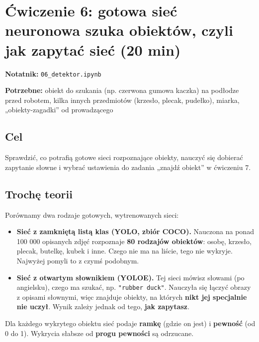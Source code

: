\section{Ćwiczenie 6: gotowa sieć neuronowa szuka obiektów, czyli jak zapytać sieć (20 min)}\label{ux107wiczenie-6-gotowa-sieux107-neuronowa-szuka-obiektuxf3w-czyli-jak-zapytaux107-sieux107-20-min}

\textbf{Notatnik:} \texttt{06\_detektor.ipynb}

\textbf{Potrzebne:} obiekt do szukania (np. czerwona gumowa kaczka) na podłodze przed robotem, kilka innych przedmiotów (krzesło, plecak, pudełko), miarka, „obiekty-zagadki'' od prowadzącego

\subsection{Cel}\label{cel}

Sprawdzić, co potrafią gotowe sieci rozpoznające obiekty, nauczyć się dobierać zapytanie słowne i wybrać ustawienia do zadania „znajdź obiekt'' w ćwiczeniu 7.

\subsection{Trochę teorii}\label{trochux119-teorii}

Porównamy dwa rodzaje gotowych, wytrenowanych sieci:

\begin{itemize}
\tightlist
\item
  \textbf{Sieć z zamkniętą listą klas (YOLO, zbiór COCO).} Nauczona na ponad 100 000 opisanych zdjęć rozpoznaje \textbf{80 rodzajów obiektów}: osobę, krzesło, plecak, butelkę, kubek i inne. Czego nie ma na liście, tego nie wykryje. Najwyżej pomyli to z czymś podobnym.
\item
  \textbf{Sieć z otwartym słownikiem (YOLOE).} Tej sieci mówisz słowami (po angielsku), czego ma szukać, np. \texttt{"rubber\ duck"}. Nauczyła się łączyć obrazy z opisami słownymi, więc znajduje obiekty, na których \textbf{nikt jej specjalnie nie uczył}. Wynik zależy jednak od tego, \textbf{jak zapytasz}.
\end{itemize}

Dla każdego wykrytego obiektu sieć podaje \textbf{ramkę} (gdzie on jest) i \textbf{pewność} (od 0 do 1). Wykrycia słabsze od \textbf{progu pewności} są odrzucane.

